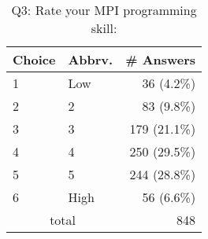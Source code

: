 \begin{table}[htb]%
\begin{center}%
\caption{Q3: Rate your MPI programming skill:}%
\label{tab:Q3-ans}%
\begin{tabular}{l|l|r}%
\hline%
Choice & Abbrv. & \# Answers \\%
\hline%
1 & Low & 36 (4.2\%) \\%
2 & 2 & 83 (9.8\%) \\%
3 & 3 & 179 (21.1\%) \\%
4 & 4 & 250 (29.5\%) \\%
5 & 5 & 244 (28.8\%) \\%
6 & High & 56 (6.6\%) \\%
\hline%
\multicolumn{2}{c}{total} & 848 \\%
\hline%
\end{tabular}%
\end{center}%
\end{table}%
